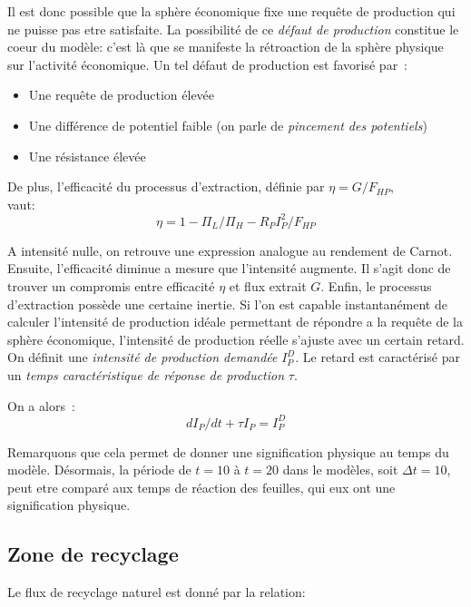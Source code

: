 \documentclass[12pt,a4paper]{article}%
\begin{document}
Il est donc possible que la sphère économique fixe une requête de
production qui ne puisse pas etre satisfaite. La possibilité de ce
\textit{défaut de production} constitue le coeur du modèle: c'est là
que se manifeste la rétroaction de la sphère physique sur l'activité
économique. Un tel défaut de production est favorisé par~:

\begin{itemize}
\item Une requête de production élevée

\item Une différence de potentiel faible (on parle de \textit{pincement des
potentiels})

\item Une résistance élevée
\end{itemize}

De plus, l'efficacité du processus d'extraction, définie par $\eta=G/F_{HP}$,
vaut:\ \ \ \ \ \ \ \ \ \ \ \ \ \ \ \ \ \ \ \
\[
\eta=1-\Pi_{L}/\Pi_{H}-R_{P}I_{P}^{2}/F_{HP}%
\]


A intensité nulle, on retrouve une expression analogue au rendement de Carnot.
Ensuite, l'efficacité diminue a mesure que l'intensité augmente. Il s'agit
donc de trouver un compromis entre efficacité $\eta$ et flux extrait $G$.
Enfin, le processus d'extraction possède une certaine inertie. Si l'on est
capable instantanément de calculer l'intensité de production idéale permettant
de répondre a la requête de la sphère économique, l'intensité de
production réelle s'ajuste avec un certain retard. On définit une
\textit{intensité de production demandée }$I_{P}^{D}$. Le retard est
caractérisé par un \textit{temps caractéristique de réponse de production
}$\tau$.

On a alors~:\ \ \ \ \ \ \ $\ \ \ \ \ \ \ \ \ \ \ \ \ $%
\[
dI_{P}/dt+\tau I_{P}=I_{P}^{D}%
\]


Remarquons que cela permet de donner une signification physique au temps du
modèle. Désormais, la période de $t=10$ à $t=20$ dans le modèles,
soit $\Delta t=10$, peut etre comparé aux temps de réaction des feuilles, qui
eux ont une signification physique.

\subsection{Zone de recyclage}

Le flux de recyclage naturel est donné par la relation:

%
\end{document}

